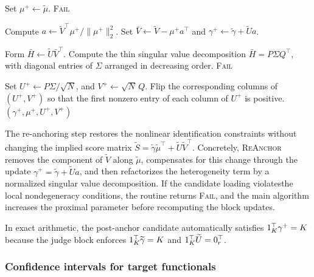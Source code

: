 \documentclass{article}
\begin{document}
\begin{bibunit}[unsrtnat]
\begin{algorithm}[!ht]
\begin{algorithmic}[1]
    \State Set $\mu^+ \gets \tilde{\mu}$.
        \State \Return \textsc{Fail} 
    \EndIf

    \State Compute $a \gets \tilde{V}^\top \mu^+ / \|\mu^+\|_2^2$.
    \State Set $\bar V \gets \tilde V - \mu^+ a^\top$ and $\gamma^{+} \gets \tilde\gamma + \tilde U a$.

    \State Form $\bar H \gets \tilde U \bar V^\top$.
    \State Compute the thin singular value decomposition $\bar H = P\Sigma Q^\top$, with diagonal entries of $\Sigma$ arranged in decreasing order.
        \State \Return \textsc{Fail} 
    \EndIf

    \State Set $U^+ \gets P\Sigma/\sqrt{N}$, and $V^+ \gets \sqrt{N}\,Q$.
    Flip the corresponding columns of $(U^+,V^+)$ so that the first nonzero entry of each column of $U^+$ is positive.
    \State \Return $(\gamma^+,\mu^+,U^+,V^+)$
    \end{algorithmic}
\end{algorithm}
The re-anchoring step restores the nonlinear identification constraints without changing the implied score matrix $\tilde S = \tilde\gamma \tilde\mu^\top + \tilde U \tilde V^\top$. Concretely, \textsc{ReAnchor} removes the component of $\tilde V$ along $\tilde\mu$, compensates for this change through the update $\gamma^{\mathrm{+}} = \tilde\gamma + \tilde U a$, and then refactorizes the heterogeneity term by a normalized singular value decomposition. If the candidate loading violatesthe local nondegeneracy conditions, the routine returns \textsc{Fail}, and the main algorithm increases the proximal parameter before recomputing the block updates.

In exact arithmetic, the post-anchor candidate automatically satisfies
$1_K^\top \gamma^{\mathrm{+}} = K$ because the judge block enforces
$1_K^\top \widetilde\gamma = K$ and $1_K^\top \widetilde U = 0_r^\top$.

\subsubsection{Confidence intervals for target functionals}


\end{bibunit}
\end{document}
